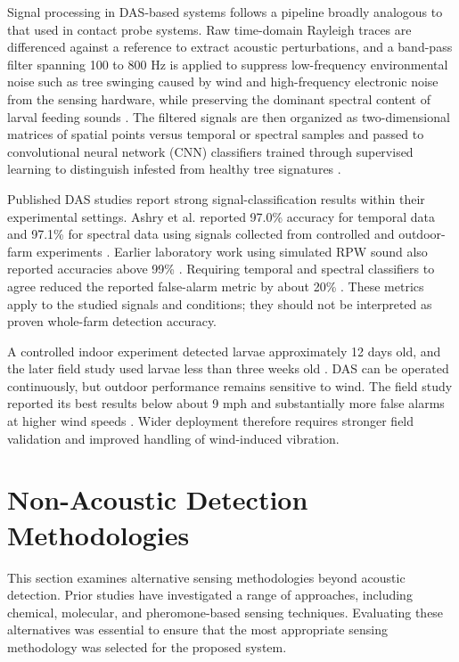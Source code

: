 \documentclass[12pt,a4paper,oneside]{memoir}
\begin{document}
Signal processing in DAS-based systems follows a pipeline broadly analogous to that used in contact probe systems. Raw time-domain Rayleigh traces are differenced against a reference to extract acoustic perturbations, and a band-pass filter spanning 100 to 800 Hz is applied to suppress low-frequency environmental noise such as tree swinging caused by wind and high-frequency electronic noise from the sensing hardware, while preserving the dominant spectral content of larval feeding sounds \cite{ashry2022cnn,wang2021}. The filtered signals are then organized as two-dimensional matrices of spatial points versus temporal or spectral samples and passed to convolutional neural network (CNN) classifiers trained through supervised learning to distinguish infested from healthy tree signatures \cite{ashry2022cnn,wang2021,mao2021}.

Published DAS studies report strong signal-classification results within their experimental settings. Ashry et al. reported 97.0\% accuracy for temporal data and 97.1\% for spectral data using signals collected from controlled and outdoor-farm experiments \cite{ashry2022cnn}. Earlier laboratory work using simulated RPW sound also reported accuracies above 99\% \cite{wang2021}. Requiring temporal and spectral classifiers to agree reduced the reported false-alarm metric by about 20\% \cite{ashry2022cnn}. These metrics apply to the studied signals and conditions; they should not be interpreted as proven whole-farm detection accuracy.

A controlled indoor experiment detected larvae approximately 12 days old, and the later field study used larvae less than three weeks old \cite{ashry2020,ashry2022cnn}. DAS can be operated continuously, but outdoor performance remains sensitive to wind. The field study reported its best results below about 9 mph and substantially more false alarms at higher wind speeds \cite{ashry2022cnn}. Wider deployment therefore requires stronger field validation and improved handling of wind-induced vibration.

\section{Non-Acoustic Detection Methodologies}
\label{sec:GRP-III}

This section examines alternative sensing methodologies beyond acoustic detection. Prior studies have investigated a range of approaches, including chemical, molecular, and pheromone-based sensing techniques. Evaluating these alternatives was essential to ensure that the most appropriate sensing methodology was selected for the proposed system.
\end{document}
